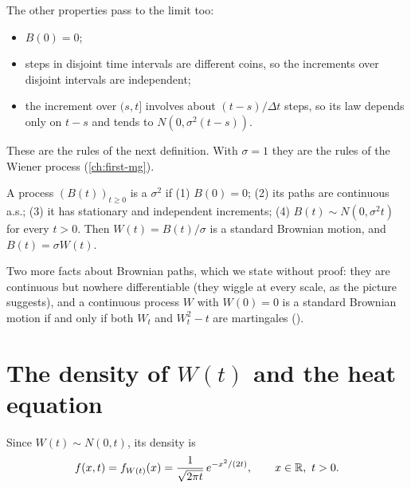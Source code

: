 The other properties pass to the limit too:
\begin{itemize}
  \item $B(0)=0$;
  \item steps in disjoint time intervals are different coins, so the increments over disjoint intervals are independent;
  \item the increment over $(s,t]$ involves about $(t-s)/\Delta t$ steps, so its law depends only on $t-s$ and tends to $N(0,\sigma^2(t-s))$.
\end{itemize}
These are the rules of the next definition. With $\sigma=1$ they are the rules of the Wiener process (\cref{ch:first-mg}).

\begin{definition}
\label{def:bm-sigma}
A process $(B(t))_{t\ge0}$ is a  $\sigma^2$ if (1) $B(0)=0$; (2) its paths are continuous a.s.; (3) it has stationary and independent increments; (4) $B(t)\sim N(0,\sigma^2t)$ for every $t>0$. Then $W(t)=B(t)/\sigma$ is a standard Brownian motion, and $B(t)=\sigma W(t)$.
\end{definition}

\begin{remark}
Two more facts about Brownian paths, which we state without proof: they are continuous but nowhere differentiable (they wiggle at every scale, as the picture suggests), and a continuous process $W$ with $W(0)=0$ is a standard Brownian motion if and only if both $W_t$ and $W_t^2-t$ are martingales ().
\end{remark}

\section{The density of $W(t)$ and the heat equation}

Since $W(t)\sim N(0,t)$, its density is
\[
  f(x,t)=f_{W(t)}(x)=\frac{1}{\sqrt{2\pi t}}\,e^{-x^2/(2t)},\qquad x\in\mathbb{R},\ t>0 .
\]

\begin{pic}
\end{pic}

